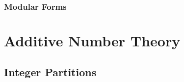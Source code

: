 
\subsubsection{Modular Forms}





\section{Additive Number Theory}


\subsection{Integer Partitions}

